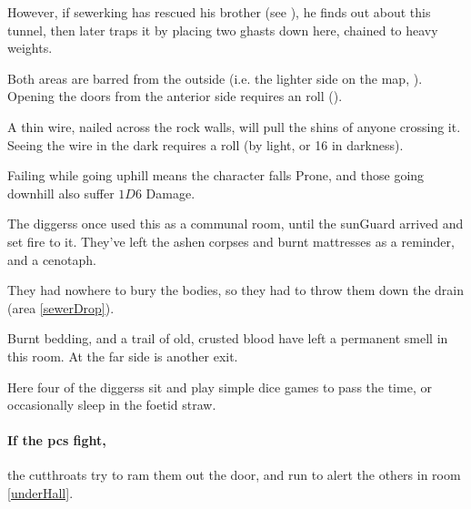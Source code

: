 \begin{multicols}{2}
However, if \gls{sewerking} has rescued his brother (see ), he finds out about this tunnel, then later traps it by placing two ghasts down here, chained to heavy weights.



Both areas are barred from the outside (i.e. the lighter side on the map, ).
Opening the doors from the anterior side requires an  roll (\tn[10]).

A thin wire, nailed across the rock walls, will pull the shins of anyone crossing it.
Seeing the wire in the dark requires a  roll (\tn[12] by light, or 16 in darkness).

Failing while going uphill means the character falls Prone,%
and those going downhill also suffer $1D6$ Damage.


\begin{exampletext}
  The \glspl{diggers} once used this as a communal room, until the \gls{sunGuard} arrived and set fire to it.
  They've left the ashen corpses and burnt mattresses as a reminder, and a cenotaph.

  They had nowhere to bury the bodies, so they had to throw them down the drain (\gls{area} \vref{sewerDrop}).
\end{exampletext}

\begin{boxtext}
  Burnt bedding, and a trail of old, crusted blood have left a permanent smell in this room.
  At the far side is another exit.
\end{boxtext}


Here four of the \glspl{diggers} sit and play simple dice games to pass the time, or occasionally sleep in the foetid straw.

\paragraph{If the \glspl{pc} fight,}
the cutthroats try to ram them out the door, and run to alert the others in room \ref{underHall}.


\label{sewerKingRoom}


\end{multicols}
